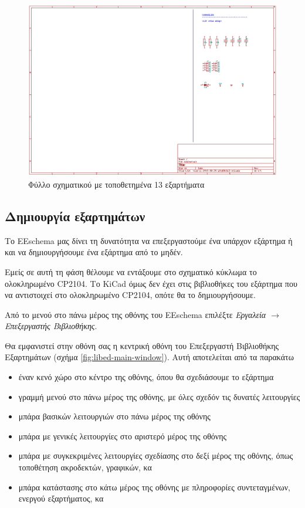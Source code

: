 \documentclass[a4paper]{article}
\begin{document}
\begin{figure}
  \begin{center}
    \includegraphics[width=.9\textwidth]{img/eesch-circ-placedccompcop.png}
    \caption{Φύλλο σχηματικού με τοποθετημένα 13 εξαρτήματα}
    \label{fig:eesch-circ-placedccompcop}
  \end{center}
\end{figure}


\subsection{Δημιουργία εξαρτημάτων}
Το \textenglish{EEschema} μας δίνει τη δυνατότητα να επεξεργαστούμε ένα υπάρχον εξάρτημα ή και να δημιουργήσουμε ένα εξάρτημα από το μηδέν.

Εμείς σε αυτή τη φάση θέλουμε να εντάξουμε στο σχηματικό κύκλωμα το ολοκληρωμένο CP2104. Το \textenglish{KiCad} όμως δεν έχει στις βιβλιοθήκες του εξάρτημα που να αντιστοιχεί στο ολοκληρωμένο CP2104, οπότε θα το δημιουργήσουμε.

Από το μενού στο πάνω μέρος της οθόνης του \textenglish{EEschema} επιλέξτε \textit{Εργαλεία $\rightarrow$ Επεξεργαστής Βιβλιοθήκης}.

Θα εμφανιστεί στην οθόνη σας η κεντρική οθόνη του Επεξεργαστή Βιβλιοθήκης Εξαρτημάτων (σχήμα \ref{fig:libed-main-window}). Αυτή αποτελείται από τα παρακάτω
\begin{itemize}
    \item έναν κενό χώρο στο κέντρο της οθόνης, όπου θα σχεδιάσουμε το εξάρτημα
    \item γραμμή μενού στο πάνω μέρος της οθόνης, με όλες σχεδόν τις δυνατές λειτουργίες
    \item μπάρα βασικών λειτουργιών στο πάνω μέρος της οθόνης
    \item μπάρα με γενικές λειτουργίες στο αριστερό μέρος της οθόνης
    \item μπάρα με συγκεκριμένες λειτουργίες σχεδίασης στο δεξί μέρος της οθόνης, όπως τοποθέτηση ακροδεκτών, γραφικών, κα
    \item μπάρα κατάστασης στο κάτω μέρος της οθόνης με πληροφορίες συντεταγμένων, ενεργού εξαρτήματος, κα
\end{itemize}
\end{document}
